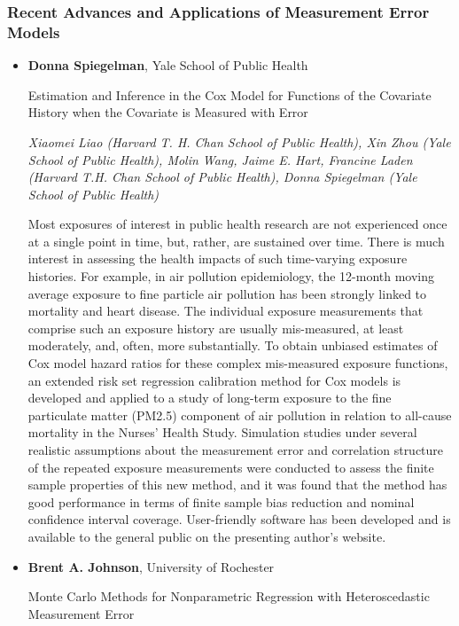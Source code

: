 \subsubsection*{Recent Advances and Applications of Measurement Error Models}

\begin{itemize}
\item \textbf{Donna Spiegelman}, Yale School of Public Health

Estimation and Inference in the Cox Model for Functions of the Covariate History when the Covariate is Measured with Error

\emph{\footnotesize Xiaomei Liao (Harvard T. H. Chan School of Public Health), Xin Zhou (Yale School of Public Health), Molin Wang, Jaime E. Hart, Francine Laden (Harvard T.H. Chan School of Public Health), Donna Spiegelman (Yale School of Public Health)}

Most exposures of interest in public health research are not experienced once at a single point in time, but, rather, are sustained over time. There is much interest in assessing the health impacts of such time-varying exposure histories. For example, in air pollution epidemiology, the 12-month moving average exposure to fine particle air pollution has been strongly linked to mortality and heart disease. The individual exposure measurements that comprise such an exposure history are usually mis-measured, at least moderately, and, often, more substantially. To obtain unbiased estimates of Cox model hazard ratios for these complex mis-measured exposure functions, an extended risk set regression calibration method for Cox models is developed and applied to a study of long-term exposure to the fine particulate matter (PM2.5) component of air pollution in relation to all-cause mortality in the Nurses’ Health Study. Simulation studies under several realistic assumptions about the measurement error and correlation structure of the repeated exposure measurements were conducted to assess the finite sample properties of this new method, and it was found that the method has good performance in terms of finite sample bias reduction and nominal confidence interval coverage. User-friendly software has been developed and is available to the general public on the presenting author’s website.

\item \textbf{Brent A. Johnson}, University of Rochester

Monte Carlo Methods for Nonparametric Regression with Heteroscedastic Measurement Error


\end{itemize}

